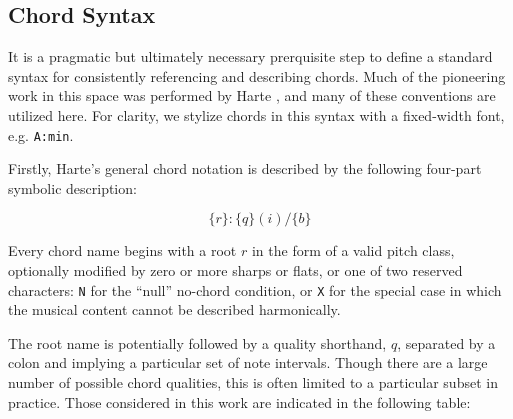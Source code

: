 \subsection{Chord Syntax}
\label{sec:chord_syntax}

It is a pragmatic but ultimately necessary prerquisite step to define a standard syntax for consistently referencing and describing chords.
Much of the pioneering work in this space was performed by Harte \cite{Harte2010}, and many of these conventions are utilized here.
For clarity, we stylize chords in this syntax with a fixed-width font, e.g. \texttt{A:min}.

Firstly, Harte's general chord notation is described by the following four-part symbolic description:

\begin{equation}
\{r\}:\{q\}(i)/\{b\}
\end{equation}

\noindent Every chord name begins with a root $r$ in the form of a valid pitch class, optionally modified by zero or more sharps or flats, or one of two reserved characters: \texttt{N} for the ``null'' no-chord condition, or \texttt{X} for the special case in which the musical content cannot be described harmonically.

The root name is potentially followed by a quality shorthand, $q$, separated by a colon and implying a particular set of note intervals.
Though there are a large number of possible chord qualities, this is often limited to a particular subset in practice.
Those considered in this work are indicated in the following table:

